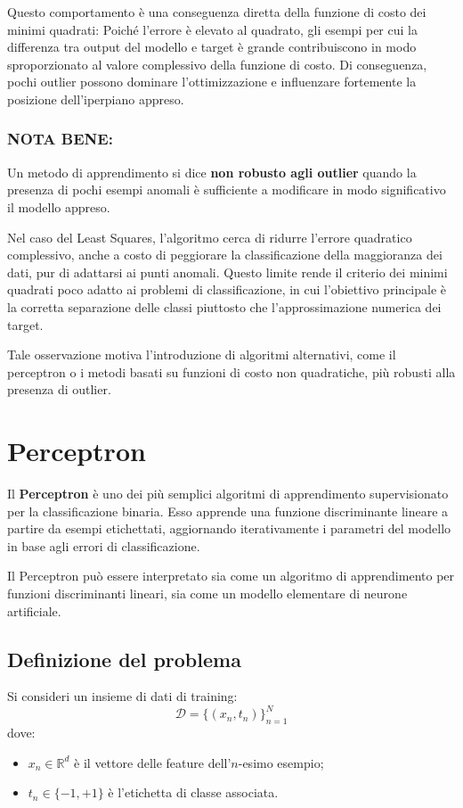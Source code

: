\documentclass[a4paper,12pt]{report}
\begin{document}
Questo comportamento è una conseguenza diretta della funzione di costo dei minimi quadrati:
Poiché l’errore è elevato al quadrato, gli esempi per cui la differenza tra output del modello e target è grande contribuiscono in modo sproporzionato al valore complessivo della funzione di costo.
Di conseguenza, pochi outlier possono dominare l’ottimizzazione e influenzare fortemente la posizione dell’iperpiano appreso.

\subsubsection{NOTA BENE:}
Un metodo di apprendimento si dice \textbf{non robusto agli outlier} quando la presenza di pochi esempi anomali è sufficiente a modificare in modo significativo il modello appreso.

Nel caso del Least Squares, l’algoritmo cerca di ridurre l’errore quadratico complessivo, anche a costo di peggiorare la classificazione della maggioranza dei dati, pur di adattarsi ai punti anomali.
Questo limite rende il criterio dei minimi quadrati poco adatto ai problemi di classificazione, in cui l’obiettivo principale è la corretta separazione delle classi piuttosto che l’approssimazione numerica dei target.

Tale osservazione motiva l’introduzione di algoritmi alternativi, come il perceptron o i metodi basati su funzioni di costo non quadratiche, più robusti alla presenza di outlier.

\section{Perceptron}

Il \textbf{Perceptron} è uno dei più semplici algoritmi di apprendimento supervisionato per la classificazione binaria.
Esso apprende una funzione discriminante lineare a partire da esempi etichettati, aggiornando iterativamente i parametri del modello in base agli errori di classificazione.

Il Perceptron può essere interpretato sia come un algoritmo di apprendimento per funzioni discriminanti lineari, sia come un modello elementare di neurone artificiale.

\subsection{Definizione del problema}

Si consideri un insieme di dati di training:
\[
\mathcal{D} = \{(x_n, t_n)\}_{n=1}^{N}
\]
dove:
\begin{itemize}
    \item \( x_n \in \mathbb{R}^d \) è il vettore delle feature dell’\(n\)-esimo esempio;
    \item \( t_n \in \{-1, +1\} \) è l’etichetta di classe associata.
\end{itemize}
\end{document}
